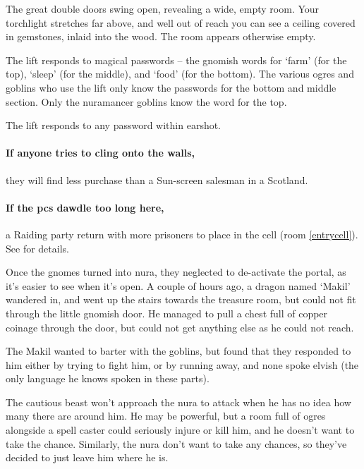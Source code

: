 \begin{multicols}{2}
\begin{boxtext}

  The great double doors swing open, revealing a wide, empty room.
  Your torchlight stretches far above, and well out of reach you can see a ceiling covered in gemstones, inlaid into the wood.
  The room appears otherwise empty.

\end{boxtext}

The lift responds to magical passwords -- the gnomish words for `farm' (for the top), `sleep' (for the middle), and `food' (for the bottom).
The various ogres and goblins who use the lift only know the passwords for the bottom and middle section.
Only the nuramancer goblins know the word for the top.

The lift responds to any password within earshot.

\paragraph{If anyone tries to cling onto the walls,}
they will find less purchase than a Sun-screen salesman in a Scotland.

\paragraph{If the \glspl{pc} dawdle too long here,}
a Raiding party return with more prisoners to place in the cell (room \ref{entrycell}).
See  for details.


\begin{exampletext}

  Once the gnomes turned into nura, they neglected to de-activate the portal, as it's easier to see when it's open.
  A couple of hours ago, a dragon named `Makil' wandered in, and went up the stairs towards the treasure room, but could not fit through the little gnomish door.
  He managed to pull a chest full of copper coinage through the door, but could not get anything else as he could not reach.

  The Makil wanted to barter with the goblins, but found that they responded to him either by trying to fight him, or by running away, and none spoke elvish (the only language he knows spoken in these parts).

  The cautious beast won't approach the nura to attack when he has no idea how many there are around him.
  He may be powerful, but a room full of ogres alongside a spell caster could seriously injure or kill him, and he doesn't want to take the chance.
  Similarly, the nura don't want to take any chances, so they've decided to just leave him where he is.


\end{exampletext}
\end{multicols}

